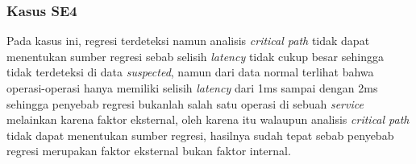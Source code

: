 \subsubsection{Kasus SE4}
Pada kasus ini, regresi terdeteksi namun analisis \textit{critical path} tidak dapat menentukan sumber regresi sebab selisih \textit{latency} tidak cukup besar sehingga tidak terdeteksi di data \textit{suspected}, namun dari data normal terlihat bahwa operasi-operasi hanya memiliki selisih \textit{latency} dari 1ms sampai dengan 2ms sehingga penyebab regresi bukanlah salah satu operasi di sebuah \textit{service} melainkan karena faktor eksternal, oleh karena itu walaupun analisis \textit{critical path} tidak dapat menentukan sumber regresi, hasilnya sudah tepat sebab penyebab regresi merupakan faktor eksternal bukan faktor internal.

